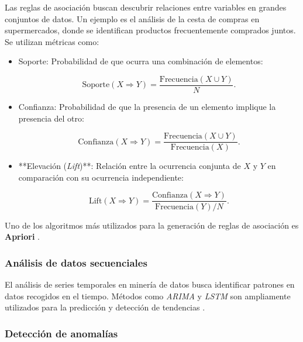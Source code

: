 \begin{itemize}
		Las reglas de asociación buscan descubrir relaciones entre variables en grandes conjuntos de datos. Un ejemplo es el análisis de la cesta de compras en supermercados, donde se identifican productos frecuentemente comprados juntos. Se utilizan métricas como:
		
		\begin{itemize}
			\item Soporte: Probabilidad de que ocurra una combinación de elementos:
			
			\begin{equation}
				\text{Soporte}(X \Rightarrow Y) = \frac{\text{Frecuencia}(X \cup Y)}{N}.
			\end{equation}
			
			\item Confianza: Probabilidad de que la presencia de un elemento implique la presencia del otro:
			
			\begin{equation}
				\text{Confianza}(X \Rightarrow Y) = \frac{\text{Frecuencia}(X \cup Y)}{\text{Frecuencia}(X)}.
			\end{equation}
			
			\item **Elevación (\textit{Lift})**: Relación entre la ocurrencia conjunta de \( X \) y \( Y \) en comparación con su ocurrencia independiente:
			
			\begin{equation}
				\text{Lift}(X \Rightarrow Y) = \frac{\text{Confianza}(X \Rightarrow Y)}{\text{Frecuencia}(Y)/N}.
			\end{equation}
		\end{itemize}
		
		Uno de los algoritmos más utilizados para la generación de reglas de asociación es \textbf{Apriori} \cite{agrawal1994fast}.
		
		\subsubsection{Análisis de datos secuenciales}
		
		El análisis de series temporales en minería de datos busca identificar patrones en datos recogidos en el tiempo. Métodos como \textit{ARIMA} y \textit{LSTM} son ampliamente utilizados para la predicción y detección de tendencias \cite{box2015time}.
		
		\subsubsection{Detección de anomalías}
		

\end{itemize}
